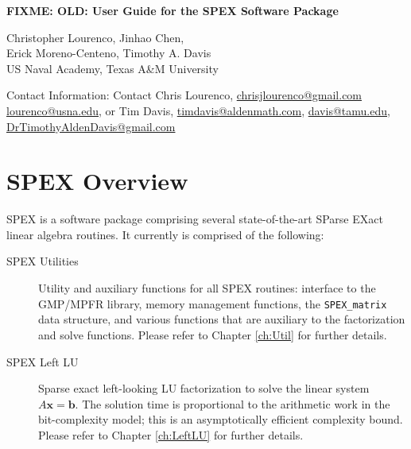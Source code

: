\documentclass[12pt]{report}
\theoremstyle{definition}
\begin{document}
\begin{center}
\begin{large}
\textbf{FIXME: OLD: User Guide for the SPEX Software Package} \\
\vspace{5mm}

\vspace{20mm}

Christopher Lourenco, Jinhao Chen, \\ Erick Moreno-Centeno, Timothy A. Davis \\

US Naval Academy, Texas A\&M University

\vspace{20mm}
Contact Information: Contact Chris Lourenco, \href{mailto:chrisjlourenco@gmail.com}{chrisjlourenco@gmail.com} \href{mailto:lourenco@usna.edu}{lourenco@usna.edu}, or Tim Davis,
\href{mailto:timdavis@aldenmath.com}{timdavis@aldenmath.com},
\href{mailto:davis@tamu.edu}{davis@tamu.edu},
\href{DrTimothyAldenDavis@gmail.com}{DrTimothyAldenDavis@gmail.com}

\end{large}
\end{center}

\newpage
\tableofcontents

\newpage

\chapter{SPEX Overview}

SPEX is a software package comprising several state-of-the-art SParse EXact
linear algebra routines. It currently is comprised of the following:

\begin{description}
\item[SPEX Utilities] Utility and auxiliary functions for all SPEX routines: interface to the GMP/MPFR library, memory management functions, the \verb|SPEX_matrix| data structure, and various functions that are auxiliary to the factorization and solve functions. Please refer to Chapter \ref{ch:Util} for further details.
\item[SPEX Left LU] Sparse exact left-looking LU factorization to solve the linear system $A \mathbf{x} = \mathbf{b}$. The solution time is proportional to the arithmetic work in the bit-complexity model; this is an asymptotically efficient complexity bound. Please refer to Chapter \ref{ch:LeftLU} for further details.
\end{description}
\end{document}
